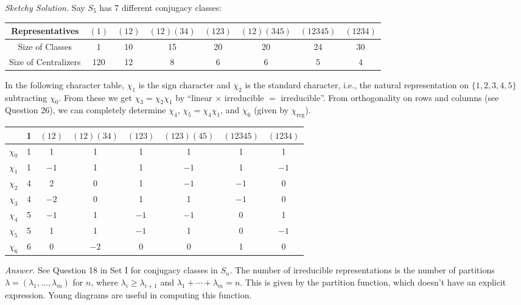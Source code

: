 \documentclass{mathproblems}
\begin{document}
\begin{questions}
\textit{Sketchy Solution.} Say $S_5$ has 7 different conjugacy classes:
\begin{center}
\begin{tabular}{c|ccccccc}
Representatives & $(1)$ & $(12)$ & $(12)(34)$ & $(123)$ & $(12)(345)$ & $(12345)$ & $(1234)$ \\
\hline
Size of Classes & 1 & 10 & 15 & 20 & 20 & 24 & 30 \\
Size of Centralizers & 120 & 12 & 8 & 6 & 6 & 5 & 4
\end{tabular}
\end{center}
In the following character table, $\chi_1$ is the sign character and $\chi_2$ is the standard character, i.e., the natural representation on $\{1,2,3,4,5\}$ subtracting $\chi_0$. From these we get $\chi_3=\chi_2\chi_1$ by ``linear $\times$ irreducible $=$ irreducible''. From orthogonality on rows and columns (see Question 26), we can completely determine $\chi_4$, $\chi_5=\chi_4\chi_1$, and $\chi_6$ (given by $\chi_{\operatorname{reg}}$).
\begin{center}
\begin{tabular}{c|ccccccc} 
& 1 & $(12)$ & $(12)(34)$ & $(123)$ & $(123)(45)$ & $(12345)$ & $(1234)$ \\
\hline$\chi_{0}$ & 1 & 1 & 1 & 1 & 1 & 1 & 1 \\
$\chi_{1}$ & 1 & $-1$ & 1 & 1 & $-1$ & 1 & $-1$ \\
$\chi_{2}$ & 4 & 2 & 0 & 1 & $-1$ & $-1$ & 0 \\
$\chi_{3}$ & 4 & $-2$ & 0 & 1 & 1 & $-1$ & 0 \\
$\chi_{4}$ & 5 & $-1$ & 1 & $-1$ & $-1$ & 0 & 1 \\
$\chi_{5}$ & 5 & 1 & 1 & $-1$ & 1 & 0 & $-1$ \\
$\chi_{6}$ & 6 & 0 & $-2$ & 0 & 0 & 1 & 0
\end{tabular}
\end{center}


\textit{Answer.} See Question 18 in Set I for conjugacy classes in $S_n$. The number of irreducible representations is the number of partitions $\lambda=(\lambda_1,\ldots,\lambda_m)$ for $n$, where $\lambda_i\geqslant \lambda_{i+1}$ and $\lambda_1+\cdots+\lambda_m=n$. This is given by the partition function, which doesn't have an explicit expression. Young diagrams are useful in computing this function.


\end{questions}
\end{document}
